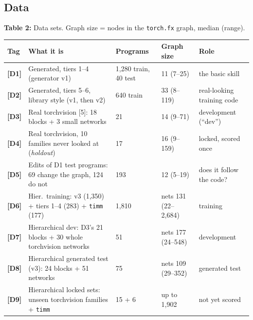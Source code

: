 \documentclass[
  t,%
]{_style/tudelft-beamerposter}
\newcommand{\tg}[1]{\textcolor{tagc}{\textbf{[#1]}}}
\newcommand{\capline}[2]{{\small\textbf{#1} #2}}
\begin{document}
\begin{frame}
\begin{minipage}[t]{0.65\linewidth}
  \section*{Data}
  {\centering
  \capline{Table 2:}{Data sets. Graph size = nodes in the \texttt{torch.fx} graph, median (range).}\\[1ex]
  {\small\setlength{\tabcolsep}{4pt}
  \begin{tabularx}{\linewidth}{@{}l>{\raggedright\arraybackslash}Xlll@{}}
    \toprule
    Tag & What it is & Programs & Graph size & Role\\
    \midrule
    \tg{D1} & Generated, tiers 1--4 (generator v1) & 1{,}280 train, 40 test & 11 (7--25) & the basic skill\\
    \tg{D2} & Generated, tiers 5--6, library style (v1, then v2) & 640 train & 33 (8--119) & real-looking training code\\
    \tg{D3} & Real torchvision [5]: 18 blocks + 3 small networks & 21 & 14 (9--71) & development (``dev'')\\
    \tg{D4} & Real torchvision, 10 families never looked at (\emph{holdout}) & 17 & 16 (9--159) & locked, scored once\\
    \tg{D5} & Edits of D1 test programs: 69 change the graph, 124 do not & 193 & 12 (5--19) & does it follow the code?\\
    \tg{D6} & Hier.\ training: v3 (1{,}350) + tiers 1--4 (283) + \texttt{timm} (177) & 1{,}810 & nets 131 (22--2{,}684) & training\\
    \tg{D7} & Hierarchical dev: D3's 21 blocks + 30 whole torchvision networks & 51 & nets 177 (24--548) & development\\
    \tg{D8} & Hierarchical generated test (v3): 24 blocks + 51 networks & 75 & nets 109 (29--352) & generated test\\
    \tg{D9} & Hierarchical locked sets: unseen torchvision families + \texttt{timm} & 15 + 6 & up to 1{,}902 & not yet scored\\
    \bottomrule
  \end{tabularx}}\par}
  \end{minipage}


\end{frame}
\end{document}
